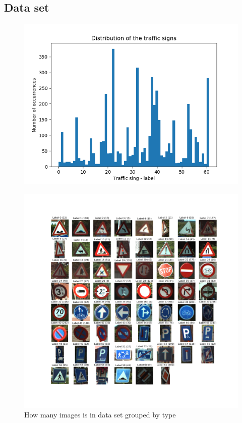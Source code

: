 \documentclass[]{report}
\begin{document}
\subsection{Data set}
\begin{figure}[H]
\centering
\includegraphics[scale=0.8]{data_hist}
\end{figure}
\begin{figure}[H]
\centerline{\includegraphics[width=1.2\linewidth]{traffic_signs}}
\caption{How many images is in data set grouped by type}
\end{figure}
\end{document}
